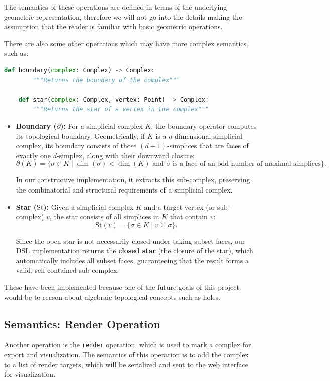 \documentclass[11pt,a4paper]{article}
\begin{document}
The semantics of these operations are defined in terms of the underlying geometric representation, therefore we will not go into the details making the assumption that the reader is familiar with basic geometric operations.

There are also some other operations which may have more complex semantics, such as:

\begin{lstlisting}[language=Python,caption={Topological Operations},label={lst:top-ops}]
    def boundary(complex: Complex) -> Complex:
        """Returns the boundary of the complex"""

    def star(complex: Complex, vertex: Point) -> Complex:
        """Returns the star of a vertex in the complex"""
\end{lstlisting}

\begin{itemize}
    \item \textbf{Boundary ($\partial$):} 
    For a simplicial complex $K$, the boundary operator computes its topological boundary. Geometrically, if $K$ is a $d$-dimensional simplicial complex, its boundary consists of those $(d-1)$-simplices that are faces of exactly one $d$-simplex, along with their downward closure:
    \[
    \partial(K) = \{ \sigma \in K \mid \dim(\sigma) < \dim(K) \text{ and } \sigma \text{ is a face of an odd number of maximal simplices} \}.
    \]

    In our constructive implementation, it extracts this sub-complex, preserving the combinatorial and structural requirements of a simplicial complex.

    \item \textbf{Star ($\text{St}$):} 
    Given a simplicial complex $K$ and a target vertex (or sub-complex) $v$, the star consists of all simplices in $K$ that contain $v$:
    \[
    \text{St}(v) = \{ \sigma \in K \mid v \subseteq \sigma \}.
    \]

    Since the open star is not necessarily closed under taking subset faces, our DSL implementation returns the \textbf{closed star} (the closure of the star), which automatically includes all subset faces, guaranteeing that the result forms a valid, self-contained sub-complex.
\end{itemize}

These have been implemented because one of the future goals of this project would be to reason about algebraic topological concepts such as holes.

\subsection{Semantics: Render Operation}
Another operation is the \texttt{render} operation, which is used to mark a complex for export and visualization. The semantics of this operation is to add the complex to a list of render targets, which will be serialized and sent to the web interface for visualization.
\end{document}
